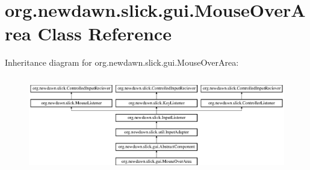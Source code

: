 \hypertarget{classorg_1_1newdawn_1_1slick_1_1gui_1_1_mouse_over_area}{}\section{org.\+newdawn.\+slick.\+gui.\+Mouse\+Over\+Area Class Reference}
\label{classorg_1_1newdawn_1_1slick_1_1gui_1_1_mouse_over_area}
Inheritance diagram for org.\+newdawn.\+slick.\+gui.\+Mouse\+Over\+Area\+:\begin{figure}[H]
\begin{center}
\leavevmode
\includegraphics[height=4.226415cm]{classorg_1_1newdawn_1_1slick_1_1gui_1_1_mouse_over_area}
\end{center}
\end{figure}
